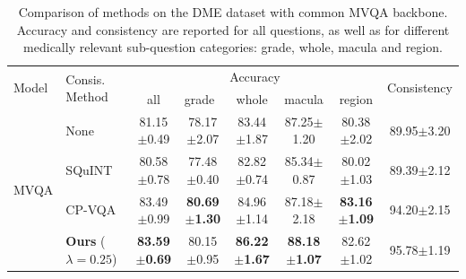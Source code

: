 \begin{table}[t]
\centering
\begin{tabular}{@{}llcccccr@{}}
\toprule
\multirow{2}{*}{Model} &  \multicolumn{1}{l}{\multirow{2}{*}{Consis. Method}}   & \multicolumn{5}{c}{Accuracy}  & \multicolumn{1}{c}{\multirow{2}{*}{Consistency}} \\ \cline{3-7}
\multicolumn{1}{c}{}         &\multicolumn{1}{c}{}                  & \multicolumn{1}{c}{all} & \multicolumn{1}{l}{grade} & \multicolumn{1}{c}{whole} & \multicolumn{1}{c}{macula} & \multicolumn{1}{c}{region} & \multicolumn{1}{l}{}                             \\ 
\midrule
\multirow{4}{*}{MVQA}     &   \multicolumn{1}{l}{None}          & \multicolumn{1}{c}{81.15$\pm$0.49}   & \multicolumn{1}{c}{78.17$\pm$2.07} & \multicolumn{1}{c}{83.44$\pm$1.87} & \multicolumn{1}{c}{87.25$\pm$1.20}  & \multicolumn{1}{c}{80.38$\pm$2.02}  & \multicolumn{1}{c}{89.95$\pm$3.20}                        \\ 

 &  \multicolumn{1}{l}{SQuINT~\cite{selvaraju2020squinting}}& \multicolumn{1}{c}{80.58$\pm$0.78}   & \multicolumn{1}{c}{77.48$\pm$0.40} & \multicolumn{1}{c}{82.82$\pm$0.74} & \multicolumn{1}{c}{85.34$\pm$0.87}  & \multicolumn{1}{c}{80.02$\pm$1.03}  & \multicolumn{1}{c}{89.39$\pm$2.12}               
\\ 

 &  \multicolumn{1}{l}{CP-VQA~\cite{tascon2022consistency}}& \multicolumn{1}{c}{83.49$\pm$0.99}   & \multicolumn{1}{c}{\textbf{80.69$\pm$1.30}} & \multicolumn{1}{c}{84.96$\pm$1.14} & \multicolumn{1}{c}{87.18$\pm$2.18} & \multicolumn{1}{c}{\textbf{83.16$\pm$1.09}}  & \multicolumn{1}{c}{94.20$\pm$2.15}  
\\ 

 &  
\multicolumn{1}{l}{{\bf Ours} ($\lambda=0.25$)}& \multicolumn{1}{c}{\textbf{83.59$\pm$0.69}}   & \multicolumn{1}{c}{80.15$\pm$0.95} & \multicolumn{1}{c}{\textbf{86.22$\pm$1.67}} & \multicolumn{1}{c}{\textbf{88.18$\pm$1.07}}  & \multicolumn{1}{c}{82.62$\pm$1.02}  & \multicolumn{1}{c}{{95.78$\pm$1.19}}  

\\ \bottomrule
                                                 
\end{tabular}
\caption{Comparison of methods on the DME dataset with common MVQA backbone. Accuracy and consistency are reported for all questions, as well as for different medically relevant sub-question categories: grade, whole, macula and region.
}
\label{tab:cons_logic_results_dme}
\end{table}
